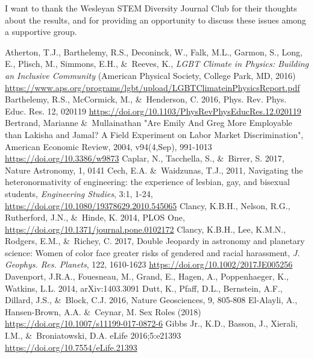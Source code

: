 \documentclass[modern]{aastex62}
\begin{document}
\acknowledgements
I want to thank the Wesleyan STEM Diversity Journal Club for their thoughts about the results, and for providing an opportunity to discuss these issues among a supportive group.

\begin{thebibliography}{}
 Atherton, T.J., Barthelemy, R.S., Deconinck, W., Falk, M.L., Garmon, S., Long, E., Plisch, M., Simmons, E.H., \&\ Reeves, K., {\it LGBT Climate in Physics: Building an Inclusive Community} (American Physical Society, College Park, MD, 2016) \url{https://www.aps.org/programs/lgbt/upload/LGBTClimateinPhysicsReport.pdf}
 Barthelemy, R.S., McCormick, M., \&\ Henderson, C. 2016, Phys. Rev. Phys. Educ. Res. 12, 020119 \url{https://doi.org/10.1103/PhysRevPhysEducRes.12.020119}
 Bertrand, Marianne \&\ Mullainathan "Are Emily And Greg More Employable than Lakisha and Jamal? A Field Experiment on Labor Market Discrimination", American Economic Review, 2004, v94(4,Sep), 991-1013 \url{https://doi.org/10.3386/w9873}
 Caplar, N., Tacchella, S., \&\ Birrer, S. 2017, Nature Astronomy, 1, 0141
 Cech, E.A. \&\ Waidzunas, T.J., 2011, Navigating the heteronormativity of engineering: the experience of lesbian, gay, and bisexual students, {\it Engineering Studies}, 3:1, 1-24, \url{https://doi.org/10.1080/19378629.2010.545065}
 Clancy, K.B.H., Nelson, R.G., Rutherford, J.N., \&\ Hinde, K. 2014, PLOS One, \url{https://doi.org/10.1371/journal.pone.0102172}
 Clancy, K.B.H., Lee, K.M.N., Rodgers, E.M., \&\ Richey, C. 2017, Double Jeopardy in astronomy and planetary science: Women of color face greater risks of gendered and racial harassment, {\it J. Geophys. Res. Planets}, 122, 1610-1623 \url{https://doi.org/10.1002/2017JE005256}
 Davenport, J.R.A., Fouesneau, M., Grand, E., Hagen, A., Poppenhaeger, K., Watkins, L.L. 2014, arXiv:1403.3091
 Dutt, K., Pfaff, D.L., Bernstein, A.F., Dillard, J.S., \&\ Block, C.J. 2016, Nature Geosciences, 9, 805-808 
 El-Alayli, A., Hansen-Brown, A.A. \&\ Ceynar, M. Sex Roles (2018) \url{https://doi.org/10.1007/s11199-017-0872-6}
 Gibbs Jr., K.D., Basson, J., Xierali, I.M., \&\ Broniatowski, D.A. eLife 2016;5:e21393 \url{https://doi.org/10.7554/eLife.21393}

\end{thebibliography}
\end{document}

